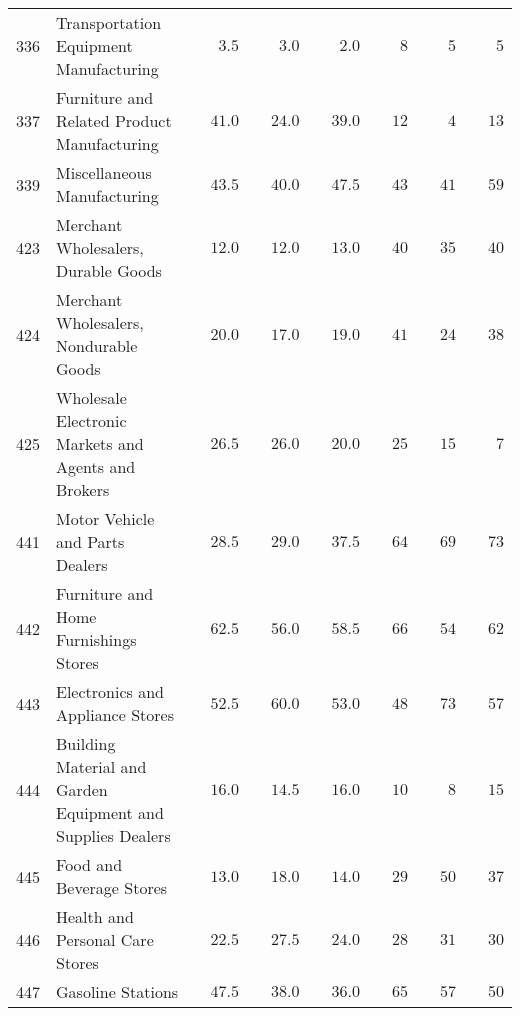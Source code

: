 \documentclass[9pt, oneside]{article}   	%
\begin{document}
\begin{longtable}{lp{3in}cccccc}
336  & Transportation Equipment Manufacturing & $\phantom{000}3.5$ & $\phantom{000}3.0$ & $\phantom{000}2.0$ & $\phantom{000}8$ & $\phantom{000}5$ & $\phantom{000}5$ \\
337  & Furniture and Related Product Manufacturing & $\phantom{00}41.0$ & $\phantom{00}24.0$ & $\phantom{00}39.0$ & $\phantom{00}12$ & $\phantom{000}4$ & $\phantom{00}13$ \\
339  & Miscellaneous Manufacturing & $\phantom{00}43.5$ & $\phantom{00}40.0$ & $\phantom{00}47.5$ & $\phantom{00}43$ & $\phantom{00}41$ & $\phantom{00}59$ \\
423  & Merchant Wholesalers, Durable Goods & $\phantom{00}12.0$ & $\phantom{00}12.0$ & $\phantom{00}13.0$ & $\phantom{00}40$ & $\phantom{00}35$ & $\phantom{00}40$ \\
424  & Merchant Wholesalers, Nondurable Goods & $\phantom{00}20.0$ & $\phantom{00}17.0$ & $\phantom{00}19.0$ & $\phantom{00}41$ & $\phantom{00}24$ & $\phantom{00}38$ \\
425  & Wholesale Electronic Markets and Agents and Brokers & $\phantom{00}26.5$ & $\phantom{00}26.0$ & $\phantom{00}20.0$ & $\phantom{00}25$ & $\phantom{00}15$ & $\phantom{000}7$ \\
441  & Motor Vehicle and Parts Dealers & $\phantom{00}28.5$ & $\phantom{00}29.0$ & $\phantom{00}37.5$ & $\phantom{00}64$ & $\phantom{00}69$ & $\phantom{00}73$ \\
442  & Furniture and Home Furnishings Stores & $\phantom{00}62.5$ & $\phantom{00}56.0$ & $\phantom{00}58.5$ & $\phantom{00}66$ & $\phantom{00}54$ & $\phantom{00}62$ \\
443  & Electronics and Appliance Stores & $\phantom{00}52.5$ & $\phantom{00}60.0$ & $\phantom{00}53.0$ & $\phantom{00}48$ & $\phantom{00}73$ & $\phantom{00}57$ \\
444  & Building Material and Garden Equipment and Supplies Dealers & $\phantom{00}16.0$ & $\phantom{00}14.5$ & $\phantom{00}16.0$ & $\phantom{00}10$ & $\phantom{000}8$ & $\phantom{00}15$ \\
445  & Food and Beverage Stores & $\phantom{00}13.0$ & $\phantom{00}18.0$ & $\phantom{00}14.0$ & $\phantom{00}29$ & $\phantom{00}50$ & $\phantom{00}37$ \\
446  & Health and Personal Care Stores & $\phantom{00}22.5$ & $\phantom{00}27.5$ & $\phantom{00}24.0$ & $\phantom{00}28$ & $\phantom{00}31$ & $\phantom{00}30$ \\
447  & Gasoline Stations & $\phantom{00}47.5$ & $\phantom{00}38.0$ & $\phantom{00}36.0$ & $\phantom{00}65$ & $\phantom{00}57$ & $\phantom{00}50$ \\

\end{longtable}
\end{document}
